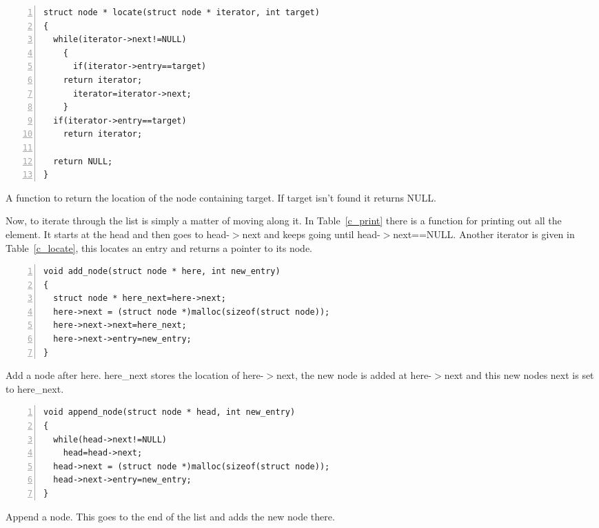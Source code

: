 \documentclass[11pt,a4paper]{scrartcl}
\begin{document}
\begin{table}
\begin{lstlisting}[numbers=left]
struct node * locate(struct node * iterator, int target)
{
  while(iterator->next!=NULL)
    {
      if(iterator->entry==target)
	return iterator;
      iterator=iterator->next;
    }
  if(iterator->entry==target)
    return iterator;

  return NULL;
}
\end{lstlisting}
\caption{A function to return the location of the node containing target. If target isn't found it returns NULL.\label{c_locate}}
\end{table}


Now, to iterate through the list is simply a matter of moving along
it. In Table~\ref{c_print} there is a function for printing out all
the element. It starts at the head and then goes to head-$>$next and
keeps going until head-$>$next==NULL. Another iterator is given in
Table~\ref{c_locate}, this locates an entry and returns a pointer to
its node.


\begin{table}
\begin{lstlisting}[numbers=left]
void add_node(struct node * here, int new_entry)
{
  struct node * here_next=here->next;
  here->next = (struct node *)malloc(sizeof(struct node));
  here->next->next=here_next;
  here->next->entry=new_entry;
}
\end{lstlisting}
\caption{Add a node after here. here\_next stores the location of here-$>$next, the new node is added at here-$>$next and this new nodes next is set to here\_next.\label{c_add}}
\end{table}


\begin{table}
\begin{lstlisting}[numbers=left]
void append_node(struct node * head, int new_entry)
{
  while(head->next!=NULL)
    head=head->next;
  head->next = (struct node *)malloc(sizeof(struct node));
  head->next->entry=new_entry;
}
\end{lstlisting}
\caption{Append a node. This goes to the end of the list and adds the
  new node there.\label{c_append}}
\end{table}
\end{document}
